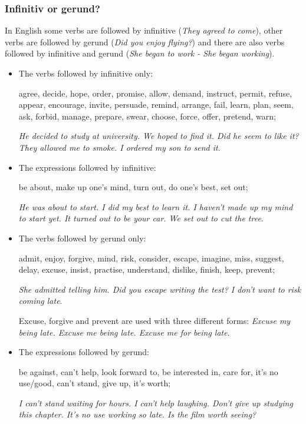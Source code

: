 \subsubsection{Infinitiv or gerund?} 

In English some verbs are followed by infinitive (\textit{They agreed to come}), other verbs are followed by gerund (\textit{Did you enjoy flying?}) and there are also verbs followed by infinitive and gerund (\textit{She began to work - She began working}).

\begin{itemize}

\item The verbs followed by infinitive only:

agree, decide, hope, order, promise, allow, demand, instruct, permit, refuse, appear, encourage, invite, persuade, remind, arrange, fail, learn, plan, seem, ask, forbid, manage, prepare, swear, choose, force, offer, pretend, warn;

\textit{He decided to study at university. We hoped to find it. Did he seem to like it? They allowed me to smoke. I ordered my son to send it}.

\item The expressions followed by infinitive:

be about, make up one's mind, turn out, do one's best, set out;

\textit{He was about to start. I did my best to learn it. I haven't made up my mind to start yet. It turned out to be your car. We set out to cut the tree}.

\item The verbs followed by gerund only:

admit, enjoy, forgive, mind, risk, consider, escape, imagine, miss, suggest, delay, excuse, insist, practise, understand, dislike, finish, keep, prevent;

\textit{She admitted telling him. Did you escape writing the test? I don't want to risk coming late}.

Excuse, forgive and prevent are used with three different forms: \textit{Excuse my being late. Excuse me being late. Excuse me for being late}. 

\item The expressions followed by gerund:

be against, can't help, look forward to, be interested in, care for, it's no use/good, can't stand, give up, it's worth;

\textit{I can't stand waiting for hours. I can't help laughing. Don't give up studying this chapter. It's no use working so late. Is the film worth seeing?}


\end{itemize}
